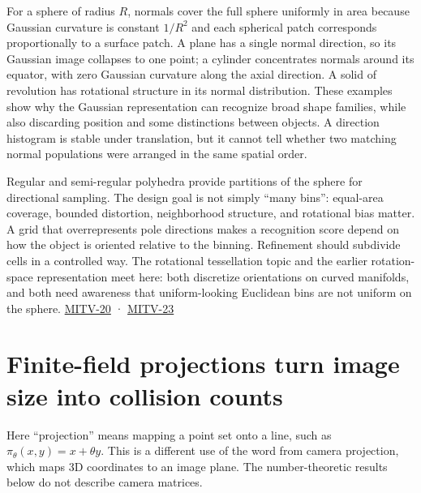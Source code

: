 For a sphere of radius \(R\), normals cover the full sphere uniformly in area because Gaussian curvature is constant \(1/R^2\) and each spherical patch corresponds proportionally to a surface patch. A plane has a single normal direction, so its Gaussian image collapses to one point; a cylinder concentrates normals around its equator, with zero Gaussian curvature along the axial direction. A solid of revolution has rotational structure in its normal distribution. These examples show why the Gaussian representation can recognize broad shape families, while also discarding position and some distinctions between objects. A direction histogram is stable under translation, but it cannot tell whether two matching normal populations were arranged in the same spatial order.

Regular and semi-regular polyhedra provide partitions of the sphere for directional sampling. The design goal is not simply ``many bins'': equal-area coverage, bounded distortion, neighborhood structure, and rotational bias matter. A grid that overrepresents pole directions makes a recognition score depend on how the object is oriented relative to the binning. Refinement should subdivide cells in a controlled way. The rotational tessellation topic and the earlier rotation-space representation meet here: both discretize orientations on curved manifolds, and both need awareness that uniform-looking Euclidean bins are not uniform on the sphere. \hyperref[04-visual-computing-ii-ch036-mitv-20---space-of-rotations-regular-tessellations-critical-surfaces-binocular-stereo]{MITV-20} · \hyperref[04-visual-computing-ii-ch036-mitv-23---gaussian-image-solids-of-revolution-direction-histograms-regular-polyhedra]{MITV-23}

\section{Finite-field projections turn image size into collision counts}\label{04-visual-computing-ii-ch032-finite-field-projections-turn-image-size-into-collision-counts}

\hypertarget{04-visual-computing-ii-ch032-finite-field-projections-turn-image-size-into-collision-counts}{}

Here ``projection'' means mapping a point set onto a line, such as \(\pi_\theta(x,y)=x+\theta y\). This is a different use of the word from camera projection, which maps 3D coordinates to an image plane. The number-theoretic results below do not describe camera matrices.

